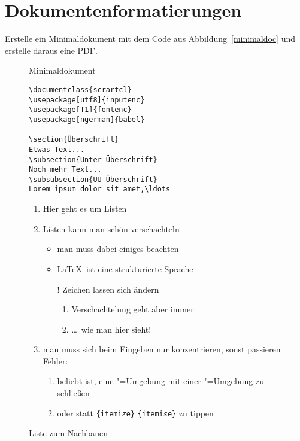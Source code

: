 \section{Dokumentenformatierungen}
\begin{uebung}
\item Erstelle ein Minimaldokument mit dem Code aus 
	Abbildung~\ref{minimaldoc} und erstelle daraus eine PDF.\label{firststart:first}

\begin{figure}[b!]
	\begin{minipage}[t]{.5\textwidth}
	\caption{Minimaldokument}\label{minimaldoc}
	\begin{verbatim}
\documentclass{scrartcl}
\usepackage[utf8]{inputenc}
\usepackage[T1]{fontenc}
\usepackage[ngerman]{babel}

\section{Überschrift}
Etwas Text...
\subsection{Unter-Überschrift}
Noch mehr Text...
\subsubsection{UU-Überschrift}
Lorem ipsum dolor sit amet,\ldots

	\end{verbatim}
	\end{minipage}
	\begin{minipage}[t]{.5\textwidth}
	\caption{Liste zum Nachbauen}\label{enumerate}\small
	\begin{enumerate}
		\item Hier geht es um Listen
		\item Listen kann man schön verschachteln
		\begin{itemize}
			\item man muss dabei einiges beachten
			\item \LaTeX\ ist eine strukturierte Sprache
			\item[!] Zeichen lassen sich ändern
			\begin{enumerate} 
				\item Verschachtelung geht aber immer
				\item \dots\ wie man hier sieht!
			\end{enumerate}
		\end{itemize}
		\item man muss sich beim Eingeben nur konzentrieren, sonst 
			passieren Fehler:
		\begin{enumerate}
			\item beliebt ist, eine "=Umgebung mit 
				einer "=Umgebung zu schließen
			\item oder statt \texttt{\{itemi\textit{z}e\}} 
				\texttt{\{itemi\textit{s}e\}} zu tippen
		\end{enumerate}
	\end{enumerate}
	\end{minipage}
\end{figure}
	

\end{uebung}
